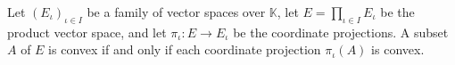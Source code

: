 Let $(E_\iota)_{\iota \in I}$ be a family of vector spaces over $\mathbb{K}$, let $E = \prod_{\iota \in I} E_\iota$ be the product vector space, and let $\pi_\iota: E \rightarrow E_\iota$ be the coordinate projections. A subset $A$ of $E$ is convex if and only if each coordinate projection $\pi_\iota(A)$ is convex.